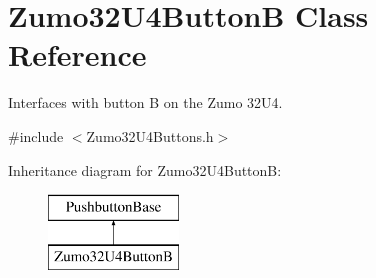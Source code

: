 \hypertarget{class_zumo32_u4_button_b}{}\section{Zumo32\+U4\+ButtonB Class Reference}
\label{class_zumo32_u4_button_b}


Interfaces with button B on the Zumo 32\+U4.  




{\ttfamily \#include $<$Zumo32\+U4\+Buttons.\+h$>$}

Inheritance diagram for Zumo32\+U4\+ButtonB\+:\begin{figure}[H]
\begin{center}
\leavevmode
\includegraphics[height=2.000000cm]{class_zumo32_u4_button_b}
\end{center}
\end{figure}
